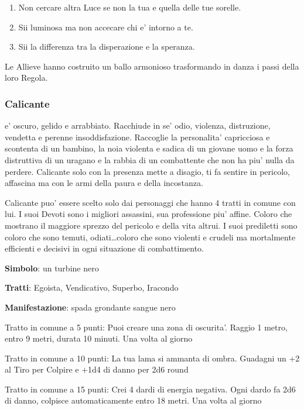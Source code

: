 \documentclass[a4paper,11pt,twoside,openany]{dndbook}
\begin{document}
{\begin{enumerate}
	\item Non cercare altra Luce se non la tua e quella delle tue sorelle.

	\item Sii luminosa ma non accecare chi e' intorno a te.

	\item Sii la differenza tra la disperazione e la speranza.
\end{enumerate}

Le Allieve hanno costruito un ballo armonioso trasformando in danza i passi della loro Regola.

\subsubsection{Calicante}

\label{calicante}

e' oscuro, gelido e arrabbiato. Racchiude in se' odio, violenza, distruzione, vendetta e perenne insoddisfazione. Raccoglie la personalita' capricciosa e scontenta di un bambino, la noia violenta e sadica di un giovane uomo e la forza distruttiva di un uragano e la rabbia di un combattente che non ha piu' nulla da perdere. Calicante solo con la presenza mette a disagio, ti fa sentire in pericolo, affascina ma con le armi della paura e della incostanza.

Calicante puo' essere scelto solo dai personaggi che hanno 4 tratti in comune con lui. I suoi Devoti sono i migliori assassini, sua professione piu' affine. Coloro che mostrano il maggiore sprezzo del pericolo e della vita altrui. I suoi prediletti sono coloro che sono temuti, odiati\ldots coloro che sono violenti e crudeli ma mortalmente efficienti e decisivi in ogni situazione di combattimento.

\textbf{Simbolo}: un turbine nero

\textbf{Tratti}: Egoista, Vendicativo, Superbo, Iracondo

\textbf{Manifestazione}: spada grondante sangue nero

\bigskip

Tratto in comune a 5 punti: Puoi creare una zona di oscurita'. Raggio 1 metro, entro 9 metri, durata 10 minuti. Una volta al giorno

Tratto in comune a 10 punti: La tua lama si ammanta di ombra. Guadagni un +2 al Tiro per Colpire e +1d4 di danno per 2d6 round

Tratto in comune a 15 punti: Crei 4 dardi di energia negativa. Ogni dardo fa 2d6 di danno, colpisce automaticamente entro 18 metri. Una volta al giorno

}
\end{document}

